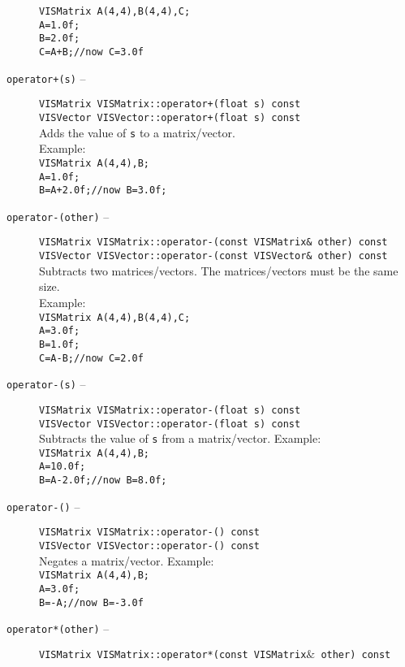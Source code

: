 \begin{description}
{\tt VISMatrix A(4,4),B(4,4),C;}\\
{\tt A=1.0f;}\\
{\tt B=2.0f;}\\
{\tt C=A+B;//now C=3.0f}
\item[{\tt operator+(s)} --]
{\tt VISMatrix VISMatrix::operator+(float s) const}\\
{\tt VISVector VISVector::operator+(float s) const}\\
Adds the value of {\tt s} to a matrix/vector.\\
Example:\\
{\tt VISMatrix A(4,4),B;}\\
{\tt A=1.0f;}\\
{\tt B=A+2.0f;//now B=3.0f;}\\
\item[{\tt operator-(other)} --]
{\tt VISMatrix VISMatrix::operator-(const VISMatrix\& other) const}\\
{\tt VISVector VISVector::operator-(const VISVector\& other) const}\\
Subtracts two matrices/vectors.  The matrices/vectors must be the same size.\\
Example:\\
{\tt VISMatrix A(4,4),B(4,4),C;}\\
{\tt A=3.0f;}\\
{\tt B=1.0f;}\\
{\tt C=A-B;//now C=2.0f}
\item[{\tt operator-(s)} --]
{\tt VISMatrix VISMatrix::operator-(float s) const}\\
{\tt VISVector VISVector::operator-(float s) const}\\
Subtracts the value of {\tt s} from a matrix/vector.  Example:\\
{\tt VISMatrix A(4,4),B;}\\
{\tt A=10.0f;}\\
{\tt B=A-2.0f;//now B=8.0f;}
\item[{\tt operator-()} --]
{\tt VISMatrix VISMatrix::operator-() const}\\
{\tt VISVector VISVector::operator-() const}\\
Negates a matrix/vector.  Example:\\
{\tt VISMatrix A(4,4),B;}\\
{\tt A=3.0f;}\\
{\tt B=-A;//now B=-3.0f}
\item[{\tt operator*(other)} --]
{\tt VISMatrix VISMatrix::operator*(const VISMatrix$\&$ other) const}\\

\end{description}
